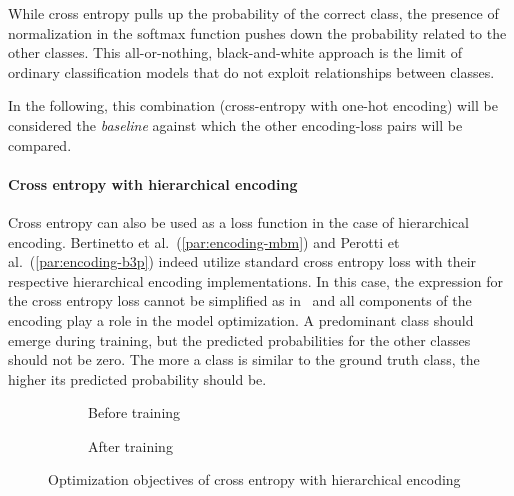 While cross entropy pulls up the probability of the correct class, the presence of normalization in the softmax function pushes down the probability related to the other classes. This all-or-nothing, black-and-white approach is the limit of ordinary classification models that do not exploit relationships between classes.

In the following, this combination (cross-entropy with one-hot encoding) will be considered the \emph{baseline} against which the other encoding-loss pairs will be compared.

\paragraph{Cross entropy with hierarchical encoding} Cross entropy can also be used as a loss function in the case of hierarchical encoding. Bertinetto et al.~(\ref{par:encoding-mbm}) and Perotti et al.~(\ref{par:encoding-b3p}) indeed utilize standard cross entropy loss with their respective hierarchical encoding implementations. In this case, the expression for the cross entropy loss cannot be simplified as in~ and all components of the encoding play a role in the model optimization.
A predominant class should emerge during training, but the predicted probabilities for the other classes should not be zero. The more a class is similar to the ground truth class, the higher its predicted probability should be.
\begin{figure}[htbp]
  \centering
  \begin{subfigure}{0.45\textwidth}
    \centering
    \begin{minipage}{\textwidth}
      \resizebox{\linewidth}{!}{}
    \end{minipage}
    \caption{Before training}
    \label{fig:03/xe-hier-before}
  \end{subfigure}
  \begin{subfigure}{0.45\textwidth}
    \centering
    \begin{minipage}{\textwidth}
      \resizebox{\linewidth}{!}{}
    \end{minipage}
    \caption{After training}
    \label{fig:03/xe-hier-after}
  \end{subfigure}
  \caption{Optimization objectives of cross entropy with hierarchical encoding}
\end{figure}

